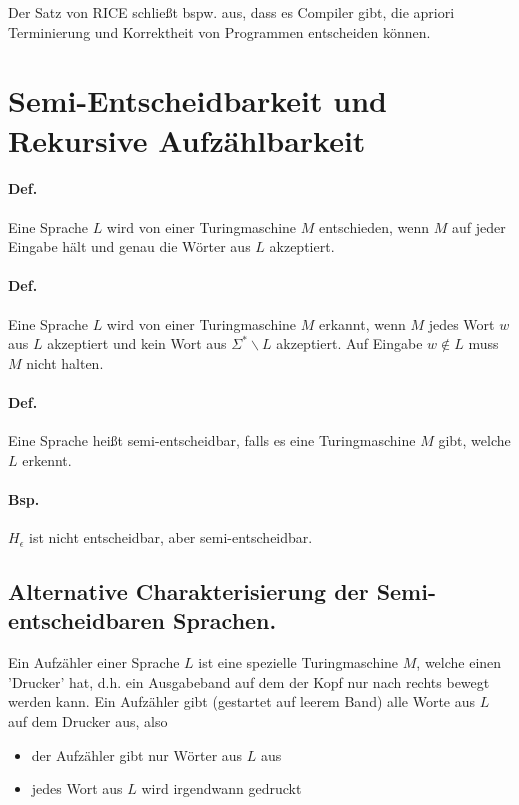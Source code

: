 \par\medskip Der Satz von RICE schließt bspw. aus, dass es Compiler gibt, die apriori Terminierung und Korrektheit von Programmen entscheiden können.


\section{Semi-Entscheidbarkeit und Rekursive Aufzählbarkeit}

\paragraph*{Def.} Eine Sprache $L$ wird von einer Turingmaschine $M$ entschieden, wenn $M$ auf jeder Eingabe hält und genau die Wörter aus $L$ akzeptiert.


\paragraph*{Def.} Eine Sprache $L$ wird von einer Turingmaschine $M$ erkannt, wenn $M$ jedes Wort $w$ aus $L$ akzeptiert und kein Wort aus $\Sigma^*\backslash L$ akzeptiert. Auf Eingabe $w \not\in L$ muss $M$ nicht halten.

\paragraph*{Def.} Eine Sprache heißt semi-entscheidbar, falls es eine Turingmaschine $M$ gibt, welche $L$ erkennt.

\paragraph*{Bsp.} $H_\epsilon$ ist nicht entscheidbar, aber semi-entscheidbar.

\subsection{Alternative Charakterisierung der Semi-entscheidbaren Sprachen.}

Ein Aufzähler einer Sprache $L$ ist eine spezielle Turingmaschine $M$, welche einen 'Drucker' hat, d.h. ein Ausgabeband auf dem der Kopf nur nach rechts bewegt werden kann. Ein Aufzähler gibt (gestartet auf leerem Band) alle Worte aus $L$ auf dem Drucker aus, also
\begin{itemize}
	\item der Aufzähler gibt nur Wörter aus $L$ aus
	\item jedes Wort aus $L$ wird irgendwann gedruckt
\end{itemize}

